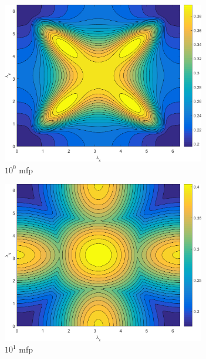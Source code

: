 \begin{figure}
	{
	\begin{subfigure}[b]{0.485\textwidth}
		\centering
		\includegraphics[width=0.975\textwidth]{figures/sec_DSA/SI_MIP_C=4_UPWLD1_LS2_x=1_dydx=1_contour.png}
		\caption{$10^{0}$ mfp}
	\end{subfigure}
	\hfill
	\begin{subfigure}[b]{0.485\textwidth}
		\centering
		\includegraphics[width=0.975\textwidth]{figures/sec_DSA/SI_MIP_C=4_UPWLD1_LS2_x=10_dydx=1_contour.png}
		\caption{$10^{1}$ mfp}
	\end{subfigure}
	}
	\vspace{0.5cm}
	{
	\begin{subfigure}[b]{0.485\textwidth}

\end{subfigure}}
\end{figure}

